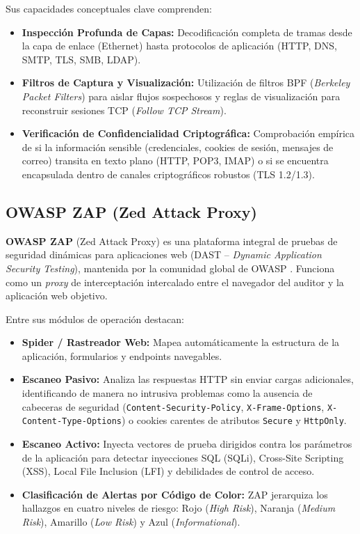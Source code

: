 Sus capacidades conceptuales clave comprenden:
\begin{itemize}
  \item \textbf{Inspección Profunda de Capas:} Decodificación completa de tramas desde la capa de enlace (Ethernet) hasta protocolos de aplicación (HTTP, DNS, SMTP, TLS, SMB, LDAP).
  \item \textbf{Filtros de Captura y Visualización:} Utilización de filtros BPF (\textit{Berkeley Packet Filters}) para aislar flujos sospechosos y reglas de visualización para reconstruir sesiones TCP (\textit{Follow TCP Stream}).
  \item \textbf{Verificación de Confidencialidad Criptográfica:} Comprobación empírica de si la información sensible (credenciales, cookies de sesión, mensajes de correo) transita en texto plano (HTTP, POP3, IMAP) o si se encuentra encapsulada dentro de canales criptográficos robustos (TLS 1.2/1.3).
\end{itemize}

\subsection{OWASP ZAP (Zed Attack Proxy)}

\textbf{OWASP ZAP} (Zed Attack Proxy) es una plataforma integral de pruebas de seguridad dinámicas para aplicaciones web (DAST -- \textit{Dynamic Application Security Testing}), mantenida por la comunidad global de OWASP \citep{owasp_top10_2021}. Funciona como un \textit{proxy} de interceptación intercalado entre el navegador del auditor y la aplicación web objetivo.

Entre sus módulos de operación destacan:
\begin{itemize}
  \item \textbf{Spider / Rastreador Web:} Mapea automáticamente la estructura de la aplicación, formularios y endpoints navegables.
  \item \textbf{Escaneo Pasivo:} Analiza las respuestas HTTP sin enviar cargas adicionales, identificando de manera no intrusiva problemas como la ausencia de cabeceras de seguridad (\texttt{Content-Security-Policy}, \texttt{X-Frame-Options}, \texttt{X-Content-Type-Options}) o cookies carentes de atributos \texttt{Secure} y \texttt{HttpOnly}.
  \item \textbf{Escaneo Activo:} Inyecta vectores de prueba dirigidos contra los parámetros de la aplicación para detectar inyecciones SQL (SQLi), Cross-Site Scripting (XSS), Local File Inclusion (LFI) y debilidades de control de acceso.
  \item \textbf{Clasificación de Alertas por Código de Color:} ZAP jerarquiza los hallazgos en cuatro niveles de riesgo: Rojo (\textit{High Risk}), Naranja (\textit{Medium Risk}), Amarillo (\textit{Low Risk}) y Azul (\textit{Informational}).
\end{itemize}

